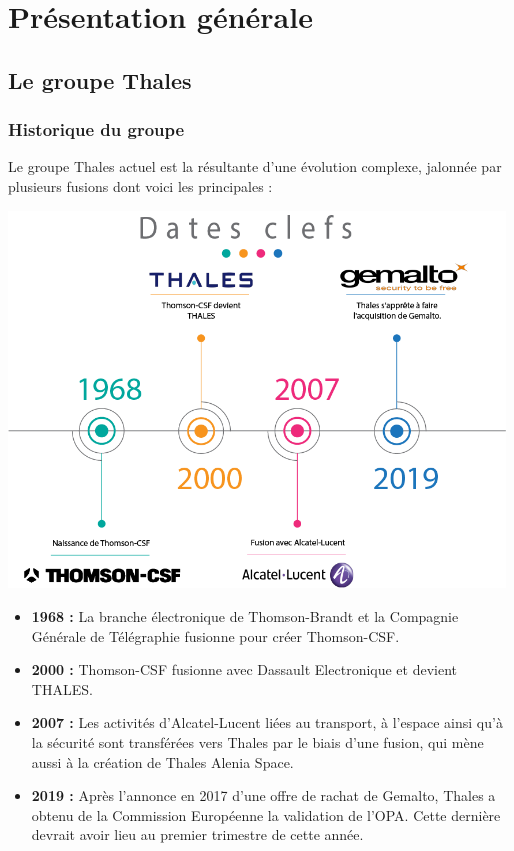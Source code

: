 \chapter{Présentation générale}
\section{Le groupe Thales}
\subsection{Historique du groupe}

Le groupe Thales actuel est la résultante d'une évolution complexe,  jalonnée par plusieurs fusions dont voici les principales :
\begin{center}
\includegraphics[height=10cm]{ressources/images/figures/timeline.png}
\end{center}

\begin{itemize}
    \item \textbf{1968 :} La branche électronique de Thomson-Brandt et la Compagnie Générale de Télégraphie fusionne pour créer Thomson-CSF.
    \item \textbf{2000 :} Thomson-CSF fusionne avec Dassault Electronique et devient THALES. 
    \item \textbf{2007 :} Les activités d'Alcatel-Lucent liées au transport, à l'espace ainsi qu'à la sécurité sont transférées vers Thales par le biais d'une fusion, qui mène aussi à la création de Thales Alenia Space. 
    \item \textbf{2019 :} Après l'annonce en 2017 d'une offre de rachat de Gemalto, Thales a obtenu de la Commission Européenne la validation de l'OPA. Cette dernière devrait avoir lieu au premier trimestre de cette année. 
\end{itemize}

